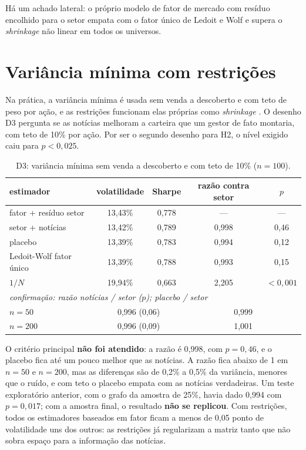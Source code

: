 Há um achado lateral: o próprio modelo de fator de mercado com resíduo encolhido para o setor empata com o
fator único de Ledoit e Wolf e supera o \emph{shrinkage} não linear em todos os universos.

\section{Variância mínima com restrições}
\label{sec:d3}

Na prática, a variância mínima é usada sem venda a descoberto e com teto de peso por ação, e as restrições
funcionam elas próprias como \emph{shrinkage} \citep{jagannathan2003}. O desenho D3 pergunta se as notícias
melhoram a carteira que um gestor de fato montaria, com teto de 10\% por ação. Por ser o segundo desenho
para H2, o nível exigido caiu para $p<0{,}025$.

\begin{table}[htbp]
\centering
\small
\caption{D3: variância mínima sem venda a descoberto e com teto de 10\% ($n=100$).}
\label{tab:d3}
\begin{tabular}{lcccc}
\toprule
estimador & volatilidade & Sharpe & razão contra setor & $p$ \\
\midrule
fator + resíduo setor & 13,43\% & 0,778 & --- & --- \\
setor + notícias & 13,42\% & 0,789 & 0,998 & 0,46 \\
placebo & 13,39\% & 0,783 & 0,994 & 0,12 \\
Ledoit-Wolf fator único & 13,39\% & 0,788 & 0,993 & 0,15 \\
$1/N$ & 19,94\% & 0,663 & 2,205 & $<0{,}001$ \\
\midrule
\multicolumn{5}{l}{\emph{confirmação: razão notícias / setor ($p$); placebo / setor}} \\
$n=50$ & \multicolumn{2}{c}{0,996 (0,06)} & \multicolumn{2}{c}{0,999} \\
$n=200$ & \multicolumn{2}{c}{0,996 (0,09)} & \multicolumn{2}{c}{1,001} \\
\bottomrule
\end{tabular}
\end{table}

O critério principal \textbf{não foi atendido}: a razão é 0,998, com $p=0{,}46$, e o placebo fica até um pouco
melhor que as notícias. A razão fica abaixo de 1 em $n=50$ e $n=200$, mas as diferenças são de 0,2\% a 0,5\% da
variância, menores que o ruído, e com teto o placebo empata com as notícias verdadeiras. Um teste
exploratório anterior, com o grafo da amostra de 25\%, havia dado 0,994 com $p=0{,}017$; com a amostra final,
o resultado \textbf{não se replicou}. Com restrições, todos os estimadores baseados em fator ficam a menos de
0,05 ponto de volatilidade uns dos outros: as restrições já regularizam a matriz tanto que não sobra espaço
para a informação das notícias.

